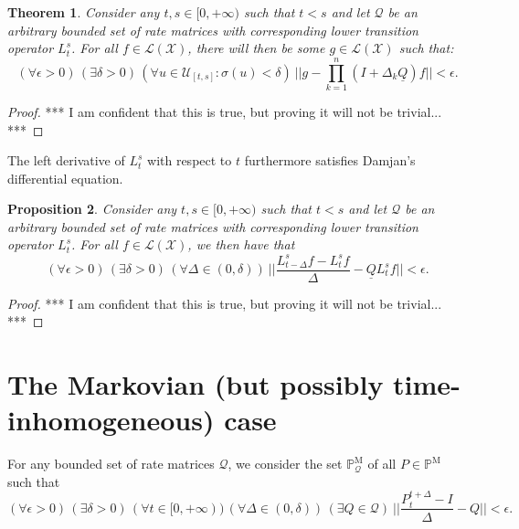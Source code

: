 \documentclass[a4paper,reqno]{amsart}
\newtheorem{theorem}{Theorem}
\newtheorem{proposition}[theorem]{Proposition}
\newcommand{\states}{\mathcal{X}}
\newcommand{\processes}{\mathbb{P}}
\newcommand{\mprocesses}{\processes^{\mathrm{M}}}
\newcommand{\lbound}{L}
\newcommand{\gambles}{\mathcal{L}}
\newcommand{\gamblesX}{\gambles(\states)}
\newcommand{\rateset}{\mathcal{Q}}
\newcommand{\lrate}{\underline{Q}}
\begin{document}
\begin{theorem}
Consider any $t,s\in[0,+\infty)$ such that $t<s$ and let $\rateset$ be an arbitrary bounded set of rate matrices with corresponding lower transition operator $\lbound_t^s$. For all \mbox{$f\in\gamblesX$}, there will then be some $g\in\gamblesX$ such that:
\begin{equation*}
(\forall\epsilon>0)\,
(\exists\delta>0)\,
(\forall u\in\mathcal{U}_{[t,s]}\colon\sigma(u)<\delta)~
\vert\vert g - \prod_{k=1}^n(I+\Delta_k\lrate)f \vert\vert<\epsilon.
\end{equation*}
\end{theorem}
\begin{proof}
*** I am confident that this is true, but proving it will not be trivial... ***
\end{proof}

The left derivative of $\lbound_t^s$ with respect to $t$ furthermore satisfies Damjan's differential equation.

\begin{proposition}
Consider any $t,s\in[0,+\infty)$ such that $t<s$ and let $\rateset$ be an arbitrary bounded set of rate matrices with corresponding lower transition operator $\lbound_t^s$. For all \mbox{$f\in\gamblesX$}, we then have that
\begin{equation*}
(\forall\epsilon>0)\,
(\exists\delta>0)\,
(\forall\Delta\in(0,\delta))~
\Big\vert\Big\vert\frac{L_{t-\Delta}^sf-L_t^sf}{\Delta}-\lrate L_t^sf\Big\vert\Big\vert<\epsilon.
\end{equation*}

\end{proposition}
\begin{proof}
*** I am confident that this is true, but proving it will not be trivial... ***
\end{proof}

\section{The Markovian (but possibly time-inhomogeneous) case}

For any bounded set of rate matrices $\rateset$, we consider the set $\mprocesses_{\rateset}$ of all $P\in\mprocesses$ such that
\begin{equation*}
(\forall\epsilon>0)\,
(\exists\delta>0)\,
(\forall t\in[0,+\infty))\,
(\forall\Delta\in(0,\delta))\,
(\exists Q\in\rateset)~
\Big\vert\Big\vert\frac{P_t^{t+\Delta}-I}{\Delta}-Q\Big\vert\Big\vert<\epsilon.
\end{equation*}
\end{document}
